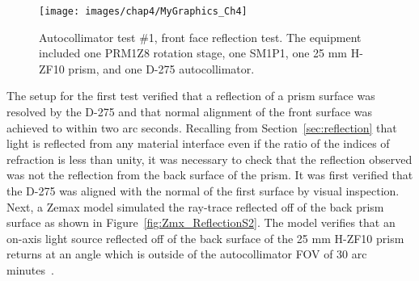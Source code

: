 \begin{figure}[H]  %
\centering
\texttt{[image: images/chap4/MyGraphics\_Ch4]}
\caption{Autocollimator test \#1, front face reflection test. The equipment included one PRM1Z8 rotation stage, one SM1P1, one 25 mm H-ZF10 prism, and one D-275 autocollimator.}
\label{fig:AutoC_Test_1}
\end{figure}

The setup for the first test verified that a reflection of a prism surface was resolved by the D-275 and that normal alignment of the front surface was achieved to within two arc seconds. Recalling from Section~\ref{sec:reflection} that light is reflected from any material interface even if the ratio of the indices of refraction is less than unity, it was necessary to check that the reflection observed was not the reflection from the back surface of the prism. It was first verified that the D-275 was aligned with the normal of the first surface by visual inspection. Next, a Zemax model simulated the ray-trace reflected off of the back prism surface as shown in Figure~\ref{fig:Zmx_ReflectionS2}. The model verifies that an on-axis light source reflected off of the back surface of the 25 mm H-ZF10 prism returns at an angle which is outside of the autocollimator \ac{FOV} of 30 arc minutes~\cite{D275}. 


